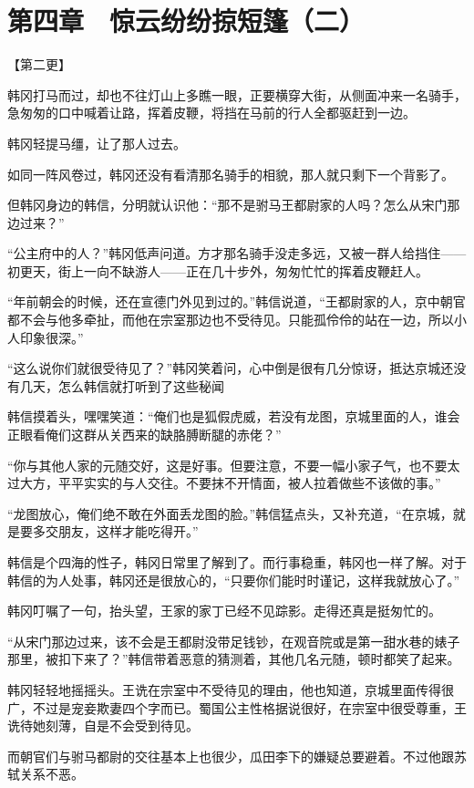\section{第四章　惊云纷纷掠短篷（二）}

【第二更】

韩冈打马而过，却也不往灯山上多瞧一眼，正要横穿大街，从侧面冲来一名骑手，急匆匆的口中喊着让路，挥着皮鞭，将挡在马前的行人全都驱赶到一边。

韩冈轻提马缰，让了那人过去。

如同一阵风卷过，韩冈还没有看清那名骑手的相貌，那人就只剩下一个背影了。

但韩冈身边的韩信，分明就认识他：“那不是驸马王都尉家的人吗？怎么从宋门那边过来？”

“公主府中的人？”韩冈低声问道。方才那名骑手没走多远，又被一群人给挡住——初更天，街上一向不缺游人——正在几十步外，匆匆忙忙的挥着皮鞭赶人。

“年前朝会的时候，还在宣德门外见到过的。”韩信说道，“王都尉家的人，京中朝官都不会与他多牵扯，而他在宗室那边也不受待见。只能孤伶伶的站在一边，所以小人印象很深。”

“这么说你们就很受待见了？”韩冈笑着问，心中倒是很有几分惊讶，抵达京城还没有几天，怎么韩信就打听到了这些秘闻

韩信摸着头，嘿嘿笑道：“俺们也是狐假虎威，若没有龙图，京城里面的人，谁会正眼看俺们这群从关西来的缺胳膊断腿的赤佬？”

“你与其他人家的元随交好，这是好事。但要注意，不要一幅小家子气，也不要太过大方，平平实实的与人交往。不要抹不开情面，被人拉着做些不该做的事。”

“龙图放心，俺们绝不敢在外面丢龙图的脸。”韩信猛点头，又补充道，“在京城，就是要多交朋友，这样才能吃得开。”

韩信是个四海的性子，韩冈日常里了解到了。而行事稳重，韩冈也一样了解。对于韩信的为人处事，韩冈还是很放心的，“只要你们能时时谨记，这样我就放心了。”

韩冈叮嘱了一句，抬头望，王家的家丁已经不见踪影。走得还真是挺匆忙的。

“从宋门那边过来，该不会是王都尉没带足钱钞，在观音院或是第一甜水巷的婊子那里，被扣下来了？”韩信带着恶意的猜测着，其他几名元随，顿时都笑了起来。

韩冈轻轻地摇摇头。王诜在宗室中不受待见的理由，他也知道，京城里面传得很广，不过是宠妾欺妻四个字而已。蜀国公主性格据说很好，在宗室中很受尊重，王诜待她刻薄，自是不会受到待见。

而朝官们与驸马都尉的交往基本上也很少，瓜田李下的嫌疑总要避着。不过他跟苏轼关系不恶。

